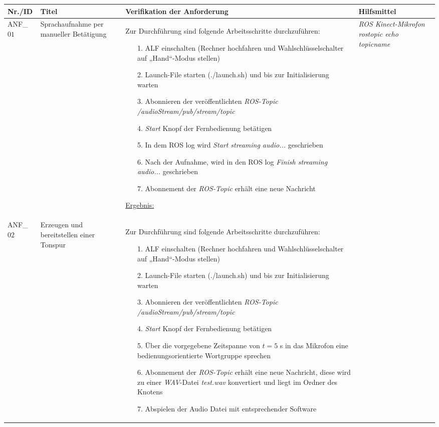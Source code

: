 \documentclass[12pt,a4paper,oneside,numbers=noenddot,captions=tableheading,toc=bibliography,openany,tikz,margin=5mm]{scrbook}
\begin{document}
	\begin{longtable}{|p{}|p{}|p{7cm}|p{}|} 
	\hline
	\textbf{Nr./ID} & \textbf{Titel} & \textbf{Verifikation der Anforderung} & \textbf{Hilfsmittel}\\
	\endhead


	\hline

ANF\_$01$ & Sprachaufnahme per manueller Betätigung & Zur Durchführung sind folgende Arbeitsschritte durchzuführen:
\begin{itemize}
	
	\item[1.]	ALF einschalten (Rechner hochfahren und Wahlschlüsselschalter auf „Hand“-Modus stellen)
	\item[2.]	Launch-File starten (./launch.sh) und bis zur Initialisierung warten
	\item[3.]	Abonnieren der veröffentlichten \textit{ROS-Topic} \textit{/audioStream/pub/stream/topic}
	\item[4.]	\textit{Start} Knopf der Fernbedienung betätigen
	\item[5.]	In dem ROS log wird \textit{Start streaming audio...} geschrieben
	\item[6.]	Nach der Aufnahme, wird in den ROS log \textit{Finish streaming audio...} geschrieben
	\item[7.]	Abonnement der \textit{ROS-Topic} erhält eine neue Nachricht
	
	
\end{itemize}

\underline{Ergebnis:}\newline
\newline

\textbf{}	%
& \textit{ROS}\newline
\textit{Kinect-Mikrofon}\newline
\textit{rostopic echo topicname}\newline
\\
\hline

ANF\_$02$ & Erzeugen und bereitstellen einer Tonspur & Zur Durchführung sind folgende Arbeitsschritte durchzuführen:
\begin{itemize}
	
	\item[1.]	ALF einschalten (Rechner hochfahren und Wahlschlüsselschalter auf „Hand“-Modus stellen)
	\item[2.]	Launch-File starten (./launch.sh) und bis zur Initialisierung warten
	\item[3.]	Abonnieren der veröffentlichten \textit{ROS-Topic} \textit{/audioStream/pub/stream/topic}
	\item[4.]	\textit{Start} Knopf der Fernbedienung betätigen
	\item[5.]	Über die vorgegebene Zeitspanne von $t=5$ s in das Mikrofon eine bedienungsorientierte Wortgruppe sprechen
	\item[6.]	Abonnement der \textit{ROS-Topic} erhält eine neue Nachricht, diese wird zu einer \textit{WAV}-Datei \textit{test.wav} konvertiert und liegt im Ordner des Knotens
	\item[7.]	Abspielen der Audio Datei mit entsprechender Software
\end{itemize}


\end{longtable}
\end{document}
